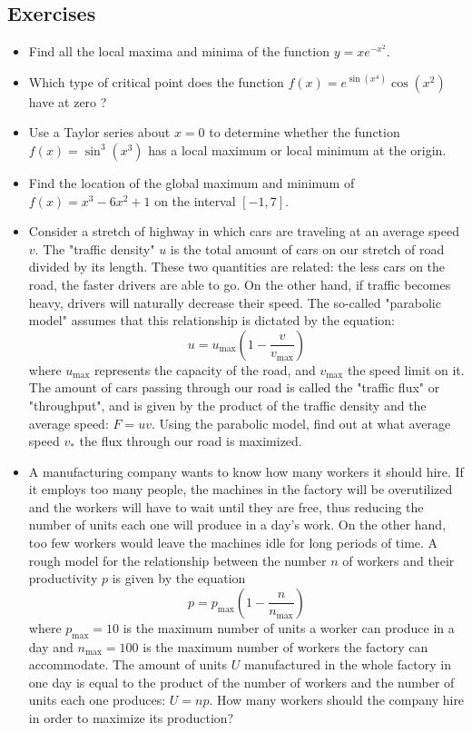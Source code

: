\documentclass[twoside,openright,titlepage,a4paper]{book}
\begin{document}
\begin{sloppypar}
\subsection{Exercises}

\begin{itemize}
\item Find all the local maxima and minima of the function $y=x e^{-x^2}$.
\item Which type of critical point does the function $f(x) = e^{\sin(x^4)}\cos(x^2)$ have at zero ?
\item Use a Taylor series about $x=0$ to determine whether the function $f(x) = \sin^3(x^3)$ has a local maximum or local minimum at the origin.
\item Find the location of the global maximum and minimum of $f(x) = x^3-6x^2+1$ on the interval $ [-1,7] $.
\item Consider a stretch of highway in which cars are traveling at an average speed $v$. The "traffic density" $u$ is the total amount of cars on our stretch of road divided by its length. These two quantities are related: the less cars on the road, the faster drivers are able to go. On the other hand, if traffic becomes heavy, drivers will naturally decrease their speed. The so-called "parabolic model" assumes that this relationship is dictated by the equation: \[ u = u_\mathrm{max} \left( 1 - \frac{v}{v_\mathrm{max}} \right) \] where $u_\mathrm{max}$ represents the capacity of the road, and $v_\mathrm{max}$ the speed limit on it. The amount of cars passing through our road is called the "traffic flux" or "throughput", and is given by the product of the traffic density and the average speed: $F = uv$. Using the parabolic model, find out at what average speed $v_\ast$ the flux through our road is maximized.
\item A manufacturing company wants to know how many workers it should hire. If it employs too many people, the machines in the factory will be overutilized and the workers will have to wait until they are free, thus reducing the number of units each one will produce in a day's work. On the other hand, too few workers would leave the machines idle for long periods of time. A rough model for the relationship between the number $n$ of workers and their productivity $p$ is given by the equation \[ p = p_\mathrm{max} \left( 1 - \frac{n}{n_\mathrm{max}} \right) \] where $p_\mathrm{max} = 10$ is the maximum number of units a worker can produce in a day and $n_\mathrm{max} = 100$ is the maximum number of workers the factory can accommodate. The amount of units $U$ manufactured in the whole factory in one day is equal to the product of the number of workers and the number of units each one produces: $ U = np $. How many workers should the company hire in order to maximize its production?

\end{itemize}
\end{sloppypar}
\end{document}
